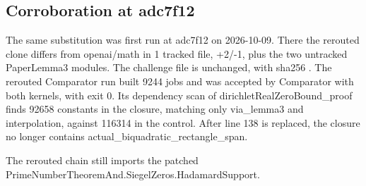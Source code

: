 \subsection{Corroboration at adc7f12}

The same substitution was first run at adc7f12 on 2026-10-09. %
There the rerouted clone differs from openai/math in 1 tracked file, +2/-1, plus the two untracked PaperLemma3 modules. %
The challenge file is unchanged, with sha256 . %
The rerouted Comparator run built 9244 jobs and was accepted by Comparator with both kernels, with exit 0. %
Its dependency scan of dirichletRealZeroBound\_proof finds 92658 constants in the closure, matching only via\_lemma3 and interpolation, against 116314 in the control. %
After line 138 is replaced, the closure no longer contains actual\_biquadratic\_rectangle\_span. %

The rerouted chain still imports the patched PrimeNumberTheoremAnd.SiegelZeros.HadamardSupport. %
